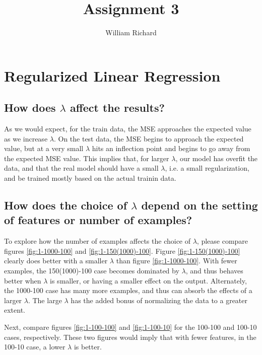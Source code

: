 \documentclass[12pt]{article}
\begin{document}
\title{Assignment 3}
\author{William Richard}
\maketitle

\section{Regularized Linear Regression}

\subsection{How does $\lambda$ affect the results?}
As we would expect, for the train data, the MSE approaches the expected value as we increase $\lambda$.  On the test data, the MSE begins to approach the expected value, but at a very small $\lambda$ hits an inflection point and begins to go away from the expected MSE value.  This implies that, for larger $\lambda$, our model has overfit the data, and that the real model should have a small $\lambda$, i.e. a small regularization, and be trained mostly based on the actual trainin  data.

\subsection{How does the choice of $\lambda$ depend on the setting of features or number of examples?}

To explore how the number of examples affects the choice of $\lambda$, please compare figures \ref{fig:1-1000-100} and \ref{fig:1-150(1000)-100}.  Figure \ref{fig:1-150(1000)-100} clearly does better with a smaller $\lambda$ than figure \ref{fig:1-1000-100}.  With fewer examples, the 150(1000)-100 case becomes dominated by $\lambda$, and thus behaves better when $\lambda$ is smaller, or  having a smaller effect on the output.  Alternately, the 1000-100 case has many more examples, and thus can absorb the effects of a larger $\lambda$.  The large $\lambda$ has the added bonus of normalizing the data to a greater extent.

Next, compare figures \ref{fig:1-100-100} and \ref{fig:1-100-10} for the 100-100 and 100-10 cases, respectively.  These two figures would imply that with fewer features, in the 100-10 case, a lower $\lambda$ is better.
\end{document}
